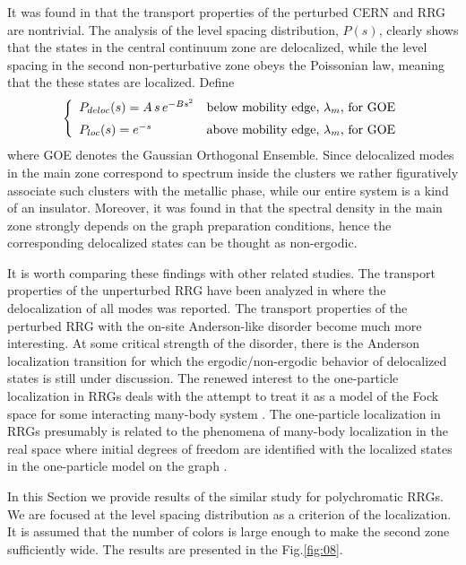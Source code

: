 \documentclass[aps,12pt]{revtex4}
\newcommand{\fig}[1]{Fig.\ref{#1}}
\newcommand{\be}{\begin{equation}}
\newcommand{\ee}{\end{equation}}
\begin{document}
It was found in \cite{anderson} that the transport properties of the perturbed CERN and RRG are nontrivial. The analysis of the level spacing distribution, $P(s)$, clearly shows that the states in the central continuum zone are delocalized, while the level spacing in the second non-perturbative zone obeys the Poissonian law, meaning that the these states are localized. Define
\be
\left\{\begin{array}{ll}
P_{deloc}(s)= A\, s\,e^{-Bs^2} & \mbox{below mobility edge, $\lambda_m$, for GOE}
\medskip \\ P_{loc}(s) = e^{-s} & \mbox{above mobility edge, $\lambda_m$, for GOE}
\end{array} \right.
\label{eq:05}
\ee
where GOE denotes the Gaussian Orthogonal Ensemble. Since delocalized modes in the main zone correspond to spectrum inside the clusters we rather figuratively associate such clusters with the metallic phase, while our entire system is a kind of an insulator. Moreover, it was found in \cite{anderson} that the spectral density in the main zone strongly depends on the graph preparation conditions, hence the corresponding delocalized states can be thought as non-ergodic.

It is worth comparing these findings with other related studies. The transport properties of the unperturbed RRG have been analyzed in \cite{spacing} where the delocalization of all modes was reported. The transport properties of the perturbed RRG with the on-site Anderson-like disorder become much more interesting. At some critical strength of the  disorder, there is the Anderson localization transition \cite{mirlin,ioffe1,ioffe2} for which the ergodic/non-ergodic behavior of delocalized states is still under discussion. The renewed interest to the one-particle localization in RRGs deals with the attempt to treat it as a model of the Fock space for some interacting many-body system \cite{levitov}. The one-particle localization in RRGs presumably is related to the phenomena of many-body localization in the real space where initial degrees of freedom are identified with the localized states in the one-particle model on the graph \cite{altshuler, gornyi}.

In this Section we provide results of the similar study for polychromatic RRGs. We are focused at the level spacing distribution as a criterion of the localization. It is assumed that the number of colors is large enough to make the second zone sufficiently wide. The results are presented in the \fig{fig:08}.
\end{document}
